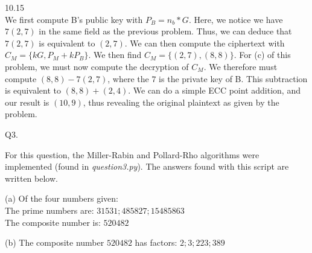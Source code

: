 \documentclass[11pt]{article}
\newcommand{\gap}{\vspace{3mm}}
\newcommand{\bigGap}{\vspace{10mm}}
\begin{document}
\gap{}

10.15\\

We first compute B's public key with $P_B=n_b * G$. Here, we notice we have $7(2,7)$ in the same field as the previous problem. Thus, we can deduce that $7(2,7)$ is equivalent to $(2,7)$. We can then compute the ciphertext with $C_M=\{kG, P_M+kP_B\}$. We then find $C_M=\{(2,7),(8,8)\}$. For (c) of this problem, we must now compute the decryption of $C_M$. We therefore must compute $(8,8)-7(2,7)$, where the $7$ is the private key of B. This subtraction is equivalent to $(8,8)+(2,4)$. We can do a simple ECC point addition, and our result is $(10,9)$, thus revealing the original plaintext as given by the problem.

\bigGap{}

Q3. \\

\gap{}

For this question, the Miller-Rabin and Pollard-Rho algorithms were implemented (found in \textit{question3.py}). The answers found with this script are written below.

\gap{}

(a) Of the four numbers given:\\
	The prime numbers are: $31531; 485827; 15485863$\\
	The composite number is: $520482$\\
	
\gap{}
	
(b) The composite number $520482$ has factors: $2; 3; 223; 389$


\bigGap{}
\end{document}
